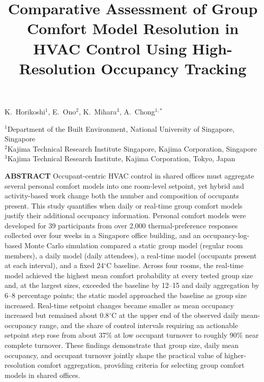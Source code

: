 \documentclass[12pt,a4paper]{article}
\title{Comparative Assessment of Group Comfort Model Resolution in HVAC Control Using High-Resolution Occupancy Tracking}
\date{}
\begin{document}
\maketitle

\noindent
K.~Horikoshi$^{1}$,
E.~Ono$^{2}$,
K.~Mihara$^{3}$,
A.~Chong$^{1,*}$

\renewcommand{\thefootnote}{\fnsymbol{footnote}}
\renewcommand{\thefootnote}{\arabic{footnote}}

\vspace{\baselineskip}

\noindent
$^{1}$Department of the Built Environment, National University of Singapore, Singapore\\
$^{2}$Kajima Technical Research Institute Singapore, Kajima Corporation, Singapore\\
$^{3}$Kajima Technical Research Institute, Kajima Corporation, Tokyo, Japan

\noindent\textbf{ABSTRACT}
Occupant-centric HVAC control in shared offices must aggregate several personal comfort models into one room-level setpoint, yet hybrid and activity-based work change both the number and composition of occupants present.
This study quantifies when daily or real-time group comfort models justify their additional occupancy information.
Personal comfort models were developed for 39 participants from over 2,000 thermal-preference responses collected over four weeks in a Singapore office building, and an occupancy-log-based Monte Carlo simulation compared a static group model (regular room members), a daily model (daily attendees), a real-time model (occupants present at each interval), and a fixed 24$^\circ$C baseline.
Across four rooms, the real-time model achieved the highest mean comfort probability at every tested group size and, at the largest sizes,
exceeded the baseline by 12--15 and daily aggregation by 6--8 percentage
points; the static model approached the baseline as group size increased.
Real-time setpoint changes became smaller as mean occupancy increased but remained about 0.8$^\circ$C at the upper end of the observed daily mean-occupancy range, and the share of control intervals requiring an actionable setpoint step rose from about 37\% at low occupant turnover to roughly 90\% near complete turnover.
These findings demonstrate that group size, daily mean occupancy, and occupant turnover jointly shape the practical value of higher-resolution comfort aggregation, providing criteria for selecting group comfort models in shared offices.
\end{document}
